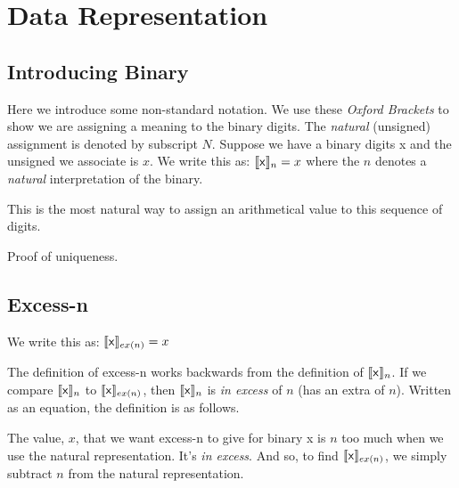 

\chapter{Data Representation}


\section{Introducing Binary}



Here we introduce some non-standard notation. 
We use these \textit{Oxford Brackets} 
to show we are assigning a meaning to the binary digits. 
The \textit{natural} (unsigned) assignment is denoted by subscript $N$. 
Suppose we have a binary digits \textsf{x} and the unsigned we associate is $x$.
We write this as: $\llbracket \text{\textsf{x}} \rrbracket_{n} = x$
where the $n$ denotes a \textit{natural} interpretation of the binary. 


This is the most natural way to assign an 
arithmetical value to this sequence of digits. 

\frmrule

Proof of uniqueness.

\frmrule



\section{Excess-n}

We write this as: $\llbracket \text{\textsf{x}} \rrbracket_{ex(n)} = x$

The definition of excess-n works backwards from the definition 
of $\llbracket \text{\textsf{x}} \rrbracket_{n}$. 
If we compare $\llbracket \text{\textsf{x}} \rrbracket_{n}$ 
to $\llbracket \text{\textsf{x}} \rrbracket_{ex(n)}$,
then $\llbracket \text{\textsf{x}} \rrbracket_{n}$ is \textit{in excess} of $n$ 
(has an extra of $n$). Written as an equation, the definition is as follows.


The value, $x$, that we want excess-n to give for binary \textsf{x} 
is $n$ too much when we use the natural representation. It's \textit{in excess}. 
And so, to find $\llbracket \text{\textsf{x}} \rrbracket_{ex(n)}$, 
we simply subtract $n$ from the natural representation. 

